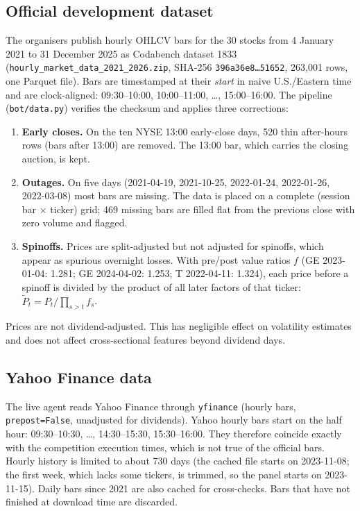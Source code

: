 \documentclass[11pt,a4paper]{article}
\newcommand{\code}[1]{\texttt{#1}}
\begin{document}
\subsection{Official development dataset}
The organisers publish hourly OHLCV bars for the 30 stocks from 4 January 2021 to 31 December 2025 as Codabench dataset
1833 (\code{hourly\_market\_data\_2021\_2026.zip}, SHA-256
\code{396a36e8\ldots51652}, 263{,}001 rows, one Parquet file). Bars are timestamped at their \emph{start} in naive
U.S./Eastern time and are clock-aligned: 09:30--10:00, 10:00--11:00, \dots, 15:00--16:00. The pipeline
(\code{bot/data.py}) verifies the checksum and applies three corrections:
\begin{enumerate}[nosep]
  \item \textbf{Early closes.} On the ten NYSE 13:00 early-close days, 520 thin after-hours rows (bars after 13:00) are
        removed. The 13:00 bar, which carries the closing auction, is kept.
  \item \textbf{Outages.} On five days (2021-04-19, 2021-10-25, 2022-01-24, 2022-01-26, 2022-03-08) most bars are
        missing. The data is placed on a complete (session bar $\times$ ticker) grid; 469 missing bars are filled flat
        from the previous close with zero volume and flagged.
  \item \textbf{Spinoffs.} Prices are split-adjusted but not adjusted for spinoffs, which appear as spurious overnight
        losses. With pre/post value ratios $f$ (GE 2023-01-04: 1.281; GE 2024-04-02: 1.253; T 2022-04-11: 1.324), each
        price before a spinoff is divided by the product of all later factors of that ticker:
        $\tilde P_t=P_t\big/\prod_{s>t}f_s$.
\end{enumerate}
Prices are not dividend-adjusted. This has negligible effect on volatility estimates and does not affect
cross-sectional features beyond dividend days.

\subsection{Yahoo Finance data}
The live agent reads Yahoo Finance through \code{yfinance} (hourly bars, \code{prepost=False}, unadjusted for
dividends). Yahoo hourly bars start on the half hour: 09:30--10:30, \dots, 14:30--15:30, 15:30--16:00. They therefore
coincide exactly with the competition execution times, which is not true of the official bars. Hourly history is
limited to about 730 days (the cached file starts on 2023-11-08; the first week, which lacks some tickers, is trimmed,
so the panel starts on 2023-11-15). Daily bars since 2021 are also cached for cross-checks. Bars that have not finished
at download time are discarded.
\end{document}
